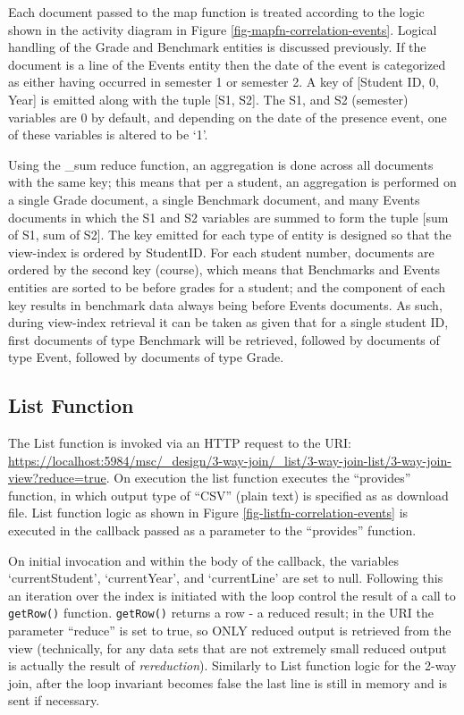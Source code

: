 Each document passed to the map function is treated according to the logic shown in the activity diagram in Figure \ref{fig-mapfn-correlation-events}. Logical handling of the Grade and Benchmark entities is discussed previously. If the document is a line of the Events entity then the date of the event is categorized as either having occurred in semester 1 or semester 2. A key of [Student ID, 0, Year] is emitted along with the tuple [S1, S2]. The S1, and S2 (semester) variables are 0 by default, and depending on the date of the presence event, one of these variables is altered to be `1'.

Using the \_sum reduce function, an aggregation is done across all documents with the same key; this means that per a student, an aggregation is performed on a single Grade document, a single Benchmark document, and many Events documents in which the S1 and S2 variables are summed to form the tuple [sum of S1, sum of S2]. The key emitted for each type of entity is designed so that the view-index is ordered by StudentID. For each student number, documents are ordered by the second key (course), which means that Benchmarks and Events entities are sorted to be before grades for a student; and the  component of each key results in benchmark data always being before Events documents. As such, during view-index retrieval it can be taken as given that for a single student ID, first documents of type Benchmark will be retrieved, followed by documents of type Event, followed by documents of type Grade.



\subsection{List Function}
The List function is invoked via an HTTP request to the URI: \url{https://localhost:5984/msc/\_design/3-way-join/\_list/3-way-join-list/3-way-join-view?reduce=true}. On execution the list function executes the ``provides'' function, in which output type of ``CSV'' (plain text) is specified as as download file. List function logic as shown in Figure \ref{fig-listfn-correlation-events} is executed in the callback passed as a parameter to the ``provides'' function.

On initial invocation and within the body of the callback, the variables `currentStudent', `currentYear', and `currentLine' are set to null. Following this an iteration over the index is initiated with the loop control the result of a call to \texttt{getRow()} function. \texttt{getRow()} returns a row - a reduced result; in the URI the parameter ``reduce'' is set to true, so ONLY reduced output is retrieved from the view (technically, for any data sets that are not extremely small reduced output is actually the result of \textit{rereduction}). Similarly to List function logic for the 2-way join, after the loop invariant becomes false the last line is still in memory and is sent if necessary.

